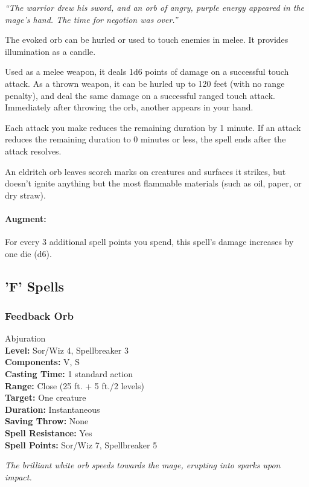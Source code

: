 \emph{``The warrior drew his sword, and an orb of angry, purple energy appeared in the mage's hand. The time for negotion was over.''}

The evoked orb can be hurled or used to touch enemies in melee. It provides illumination as a candle.

Used as a melee weapon, it deals 1d6 points of damage on a successful touch attack.
As a thrown weapon, it can be hurled up to 120 feet (with no range penalty), and deal the same damage on a successful ranged touch attack. Immediately after throwing the orb, another appears in your hand.

Each attack you make reduces the remaining duration by 1 minute. 
If an attack reduces the remaining duration to 0 minutes or less, the spell ends after the attack resolves.

An eldritch orb leaves scorch marks on creatures and surfaces it strikes, but doesn't ignite anything but the most flammable materials (such as oil, paper, or dry straw).

\paragraph{Augment:} For every 3 additional spell points you spend, this spell's damage increases by one die (d6).

\subsection{'F' Spells}

\subsubsection{Feedback Orb}
\label{Spell:FeedbackOrb}
Abjuration
\\ \textbf{Level:} Sor/Wiz 4, Spellbreaker 3
\\ \textbf{Components:} V, S
\\ \textbf{Casting Time:} 1 standard action
\\ \textbf{Range:} Close (25 ft. + 5 ft./2 levels)
\\ \textbf{Target:} One creature
\\ \textbf{Duration:} Instantaneous
\\ \textbf{Saving Throw:} None
\\ \textbf{Spell Resistance:} Yes
\\ \textbf{Spell Points:} Sor/Wiz 7, Spellbreaker 5

\emph{The brilliant white orb speeds towards the mage, erupting into sparks upon impact.}

